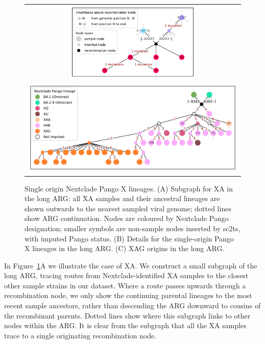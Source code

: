 \documentclass{article}
\begin{document}
\begin{figure}
\begin{tabularx}{\textwidth}{c}


\includegraphics[width=0.6\textwidth]{figures/Pango_XA_nxcld_tight_graph.pdf}
\\ %
\includegraphics[width=\textwidth]{figures/Pango_XAG_nxcld_tight_graph.pdf}
\end{tabularx} \caption{\label{fig:pango-single-origin-graph} Single origin
Nextclade Pango X lineages. (A) Subgraph for XA in the long ARG: all XA samples
and their ancestral lineages are shown outwards to the nearest sampled viral
genome; dotted lines show ARG continuation. Nodes are coloured by Nextclade
Pango designation; smaller symbols are non-sample nodes inserted by sc2ts, with
imputed Pango status. (B) Details for the single-origin Pango X lineages in the
long ARG. (C) XAG origins in the long ARG.
} \end{figure}

In Figure~\ref{fig:pango-single-origin-graph}A we illustrate the case of XA. We construct a small subgraph of the long ARG, tracing routes from Nextclade-identified XA samples to the closest other sample strains in our dataset. Where a route passes upwards through a recombination node, we only show the continuing parental lineages to the most recent sample ancestors, rather than descending the ARG downward to cousins of the recombinant parents. Dotted lines show where this subgraph links to other nodes within the ARG. It is clear from the subgraph that all the XA samples trace to a single originating recombination node.
\end{document}
